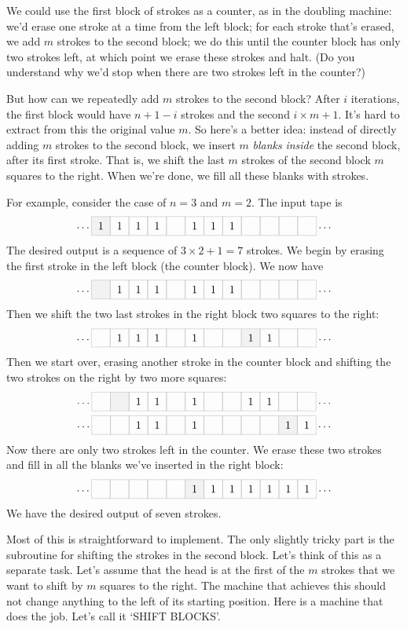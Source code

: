 We could use the first block of strokes as a counter,
as in the doubling machine:
we'd erase one stroke at a time from the left block;
for each stroke that's erased,
we add $m$ strokes to the second block;
we do this until the counter block has only two strokes left,
at which point we erase these strokes and halt.
(Do you understand why we'd stop when there are two strokes left in the counter?)

But how can we repeatedly add $m$ strokes to the second block?
After $i$ iterations,
the first block would have $n+1-i$ strokes and the second $i\times m + 1$.
It's hard to extract from this the original value $m$.
So here's a better idea:
instead of directly adding $m$ strokes to the second block,
we insert $m$ \emph{blanks} \emph{inside} the second block,
after its first stroke.
That is,
we shift the last $m$ strokes of the second block $m$ squares to the right.
When we're done,
we fill all these blanks with strokes.

For example, consider the case of $n=3$ and $m=2$.
The input tape is
\[
  \ldots \turingtape{{1,1,1,1, ,1,1,1, , , , }}{0} \ldots
\]
The desired output is a sequence of $3 \times 2 +1 = 7$ strokes.
We begin by erasing the first stroke in the left block (the counter block).
We now have
\[
  \ldots \turingtape{{ ,1,1,1, ,1,1,1, , , , }}{0} \ldots
\]
Then we shift the two last strokes in the right block two squares to the right:
\[
  \ldots \turingtape{{ ,1,1,1, ,1, , ,1,1, , }}{8} \ldots
\]
Then we start over,
erasing another stroke in the counter block
and shifting the two strokes on the right by two more squares:
\begin{gather*}
  \ldots \turingtape{{ , ,1,1, ,1, , ,1,1, , }}{1} \ldots \\
  \ldots \turingtape{{ , ,1,1, ,1, , , , ,1,1}}{10} \ldots
\end{gather*}
Now there are only two strokes left in the counter.
We erase these two strokes
and fill in all the blanks we've inserted in the right block:
\[
  \ldots \turingtape{{ , , , , ,1,1,1,1,1,1,1}}{5} \ldots
\]
We have the desired output of seven strokes.

Most of this is straightforward to implement.
The only slightly tricky part is the subroutine for shifting the strokes in the second block.
Let's think of this as a separate task.
Let's assume that the head is at the first of the $m$ strokes that we want to shift by $m$ squares to the right.
The machine that achieves this
should not change anything to the left of its starting position.
Here is a machine that does the job.
Let's call it `SHIFT BLOCKS'.

